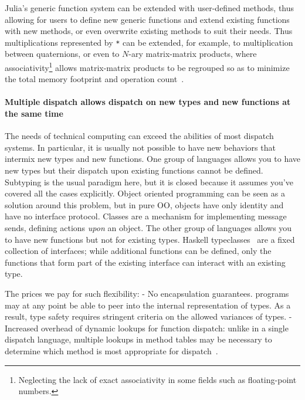 \documentclass[pldi]{sigplanconf-pldi15}
\begin{document}
Julia's generic function system can be extended with user-defined methods, thus
allowing for users to define new generic functions and extend existing
functions with new methods, or even overwrite existing methods to suit their
needs. Thus multiplications represented by \verb|*| can be extended, for
example, to multiplication between quaternions, or even to $N$-ary
matrix-matrix products, where associativity\footnote{Neglecting the lack of
exact associativity in some fields such as floating-point numbers.} allows
matrix-matrix products to be regrouped so as to minimize the total memory
footprint and operation count~\cite{Hu1984}.

\paragraph{Multiple dispatch allows dispatch on new types and new functions at the same time}
The needs of technical computing can exceed the abilities of most dispatch
systems.  In particular, it is usually not possible to have new behaviors that
intermix new types and new functions.  One group of languages allows you to
have new types but their dispatch upon existing functions cannot be defined.
Subtyping is the usual paradigm here, but it is closed because it assumes
you've covered all the cases explicitly.  Object oriented programming can be
seen as a solution around this problem, but in pure OO, objects have only
identity and have no interface protocol.  Classes are a mechanism for
implementing message sends, defining actions \textit{upon} an object.  The
other group of languages allows you to have new functions but not for existing
types.  Haskell typeclasses~\cite{typeclass} are a fixed collection of
interfaces; while additional functions can be defined, only the functions that
form part of the existing interface can interact with an existing type.

The prices we pay for such flexibility:
- No encapsulation guarantees.  programs may at any point be able to peer into
the internal representation of types. As a result, type safety requires
stringent criteria on the allowed variances of types.
- Increased overhead of dynamic lookups for function dispatch: unlike in a single dispatch language, multiple lookups in method tables may be necessary to determine which method is most appropriate for dispatch~\cite{Bruce1995}.

\end{document}
